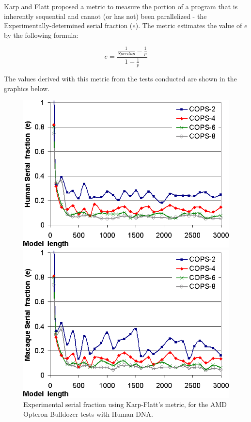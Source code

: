Karp and Flatt \cite{karpflatt} proposed a metric to measure the portion of a program that is inherently sequential and cannot (or has not) been parallelized - the Experimentally-determined serial fraction ($e$). The metric estimates the value of $e$ by the following formula:

$$ e = \frac{ \displaystyle \frac{1}{Speedup} - \frac{1}{p} } { \displaystyle 1 - \frac{1}{p} } $$

The values derived with this metric from the tests conducted are shown in the graphics below.

\begin{figure}[h!]
    \begin{minipage}{0.48\linewidth}
		\centering
		\includegraphics[scale=0.46]{graphics/karp-flatt-aleph-human.png}
		\caption[Serial fraction on AMD Opteron Bulldozer, Human] {Experimental serial fraction using Karp-Flatt's metric, for the AMD Opteron Bulldozer tests with Human DNA.}
	\label{karp-flatt-aleph-human}
    \end{minipage}
    \hspace{0.04\linewidth}
    \begin{minipage}{0.48\linewidth}
		\centering
		\includegraphics[scale=0.46]{graphics/karp-flatt-aleph-macaque.png}

\end{minipage}
\end{figure}
